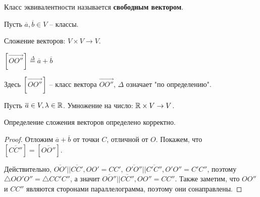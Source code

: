 	\begin{Def}
		Класс эквивалентности называется \textbf{свободным вектором}.
	\end{Def}


	Пусть $\overline{a}, \overline{b} \in V$ -- классы.

	\begin{Def}
		Сложение векторов: $V \times V \to V$.
		\begin{figure}[H]
			\centering
			
		\end{figure}
		$[\overrightarrow{OO''}] \stackrel{\Delta}{=} \overline{a} + \overline{b}$ 
	\end{Def}

	\begin{Rem}
		Здесь $[\overrightarrow{OO''}]$ -- класс вектора $\overrightarrow{OO''}$, $\Delta$ означает "по определению". 	   
	\end{Rem}

	\begin{Def}
		Пусть $\overline{a} \in V, \lambda \in \mathbb{R}$. Умножение на число: $\mathbb{R} \times V \to V$.
	\end{Def}

	\begin{Thm}
		Определение сложения векторов определено корректно.
	\end{Thm}

	\begin{proof}
		Отложим $\overline{a} + \overline{b}$ от точки $C$, отличной от $O$. Покажем, что $[\overline{CC''}] = [\overline{OO''}]$.
		\begin{figure}[H]
			\centering
			
		\end{figure}
		Действительно, $\overline{OO'} || \overline{CC'}, OO' = CC', \ \overline{O'O''} || \overline{C'C''}, O'O'' = C'C''$, поэтому $\triangle OO'O'' = \triangle CC'C''$, а значит $\overline{OO''} || \overline{CC''}, OO'' = CC''$. Также заметим, что $OO''$ и $CC''$ являются сторонами параллелограмма, поэтому они сонаправлены.     
	\end{proof}
	
